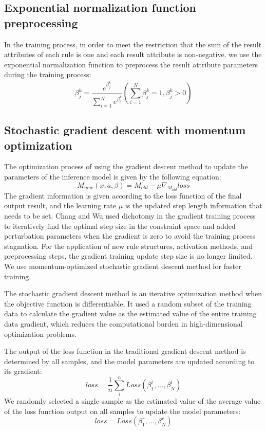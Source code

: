 \documentclass{ieeeaccess}
\begin{document}
\subsection{Exponential normalization function preprocessing}
In the training process, in order to meet the restriction that the sum of the result attributes of each rule is one and each result attribute is non-negative,
we use the exponential normalization function to preprocess the result attribute parameters during the training process:
$$\beta_j^k=\frac{e^{\overline{\beta_j^k}}}{\sum_{i=1}^Ne^{\overline{\beta_i^k}}}(\sum_{i=1}^N\beta_j^k=1,\beta_j^k>0)$$

\subsection{Stochastic gradient descent with momentum optimization}
The optimization process of using the gradient descent method to update the parameters of the inference model is given by the following equation:
$$M_{new}(x,a,\beta)=M_{old}-\mu\nabla_{M_{old}}loss$$
The gradient information is given according to the loss function of the final output result, and the learning rate $\mu$ is the updated step length information that needs to be set.
Chang\cite{a11} and Wu\cite{a13} used dichotomy in the gradient training process to iteratively find the optimal step size in the constraint space and added perturbation parameters when the gradient is zero to avoid the training process stagnation.
For the application of new rule structures, activation methods, and preprocessing steps, the gradient training update step size is no longer limited.
We use momentum-optimized stochastic gradient descent method for faster training.

The stochastic gradient descent method is an iterative optimization method when the objective function is differentiable,
It used a random subset of the training data to calculate the gradient value as the estimated value of the entire training data gradient,
which reduces the computational burden in high-dimensional optimization problems.

The output of the loss function in the traditional gradient descent method is determined by all samples,
and the model parameters are updated according to its gradient:
$$loss=\frac{1}{n}\sum_i^nLoss(\beta_1^i,...,\beta_N^i)$$
We randomly selected a single sample as the estimated value of the average value of the loss function output on all samples to update the model parameters:
$$loss=Loss(\beta_1^r,...,\beta_N^r)$$
\end{document}
